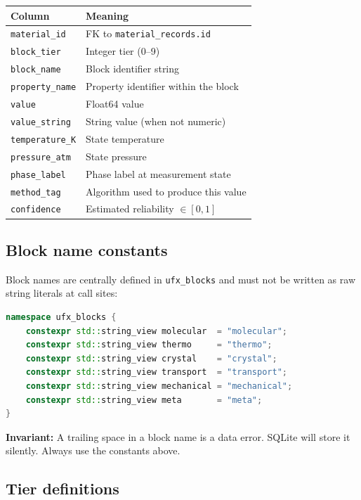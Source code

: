 \documentclass[11pt,letterpaper]{article}
\begin{document}
\begin{center}
\begin{tabular}{ll}
\toprule
Column & Meaning \\
\midrule
\texttt{material\_id}   & FK to \texttt{material\_records.id} \\
\texttt{block\_tier}    & Integer tier (0--9) \\
\texttt{block\_name}    & Block identifier string \\
\texttt{property\_name} & Property identifier within the block \\
\texttt{value}          & Float64 value \\
\texttt{value\_string}  & String value (when not numeric) \\
\texttt{temperature\_K} & State temperature \\
\texttt{pressure\_atm}  & State pressure \\
\texttt{phase\_label}   & Phase label at measurement state \\
\texttt{method\_tag}    & Algorithm used to produce this value \\
\texttt{confidence}     & Estimated reliability $\in [0, 1]$ \\
\bottomrule
\end{tabular}
\end{center}

\subsection{Block name constants}

Block names are centrally defined in \texttt{ufx\_blocks} and must
not be written as raw string literals at call sites:

\begin{lstlisting}[language=C++]
namespace ufx_blocks {
	constexpr std::string_view molecular  = "molecular";
	constexpr std::string_view thermo     = "thermo";
	constexpr std::string_view crystal    = "crystal";
	constexpr std::string_view transport  = "transport";
	constexpr std::string_view mechanical = "mechanical";
	constexpr std::string_view meta       = "meta";
}
\end{lstlisting}

\textbf{Invariant:} A trailing space in a block name is a data error.
SQLite will store it silently.  Always use the constants above.

\subsection{Tier definitions}
\end{document}
